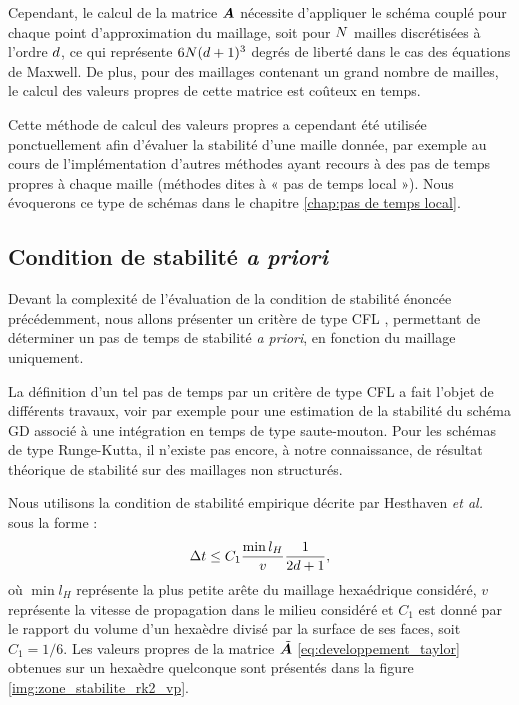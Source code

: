 Cependant, le calcul de la matrice $\bm{A}$ nécessite d'appliquer le schéma couplé
pour chaque point d'approximation du maillage, soit pour $N$ mailles discrétisées
à l'ordre $d$, ce qui représente $6 N (d + 1)^3$ degrés de liberté dans le cas
des équations de Maxwell.
De plus, pour des maillages contenant un grand nombre de mailles,
le calcul des valeurs propres de cette matrice est coûteux en temps.

Cette méthode de calcul des valeurs propres a cependant été utilisée ponctuellement
afin d'évaluer la stabilité d'une maille donnée, par exemple au cours de l'implémentation d'autres
méthodes ayant recours à des pas de temps propres à chaque maille
(méthodes dites à « pas de temps local »). Nous évoquerons
ce type de schémas dans le chapitre \ref{chap:pas de temps local}.
\\


\subsection{Condition de stabilité \emph{a priori}}
\label{ssect:stabilite_a_priori}

Devant la complexité de l'évaluation de la condition de stabilité énoncée précédemment,
nous allons présenter un critère de type CFL \cite{Courant1928},
permettant de déterminer un pas de temps
de stabilité \emph{a priori}, en fonction du maillage uniquement.

La définition d’un tel pas de temps par un critère de type CFL a fait l’objet de différents travaux,
voir par exemple \cite{kubatko2008time, Hesthaven:2007:NDG:1557392, fezoui2005convergence} pour une estimation de la stabilité du schéma
GD associé à une intégration en temps de type saute-mouton. Pour les schémas de type Runge-Kutta, il n'existe pas
encore, à notre connaissance, de résultat théorique de stabilité sur des maillages non structurés.

Nous utilisons la condition de stabilité empirique décrite par Hesthaven \textit{et al.} \cite{Hesthaven:2007:NDG:1557392} sous la forme :
\begin{align}
	\Delta t \le C_1 \frac{\min l_H}{v} \frac{1}{2 d + 1} ,
	\label{eq:cfl1}
\end{align}
où $\min l_H$ représente la plus petite arête du maillage hexaédrique considéré, $v$ représente la vitesse de propagation dans le milieu considéré
et $C_1$ est donné par le rapport du volume d'un hexaèdre divisé par la surface
de ses faces, soit $C_1 = 1/6$.
Les valeurs propres de la matrice $\tilde{\bm{A}}$ \eqref{eq:developpement_taylor}
obtenues sur un hexaèdre quelconque sont présentés dans la figure \ref{img:zone_stabilite_rk2_vp}.

